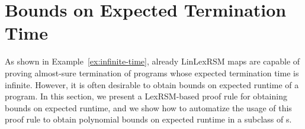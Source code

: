 \section{Bounds on Expected Termination Time}

As shown in Example~\ref{ex:infinite-time}, already LinLexRSM maps are capable of proving almost-sure termination of programs whose expected termination time is infinite. However, it is often desirable to obtain bounds on expected runtime of a program. In this section, we present a LexRSM-based proof rule for obtaining bounds on expected runtime, and we show how to automatize the usage of this proof rule to obtain polynomial bounds on expected runtime in a subclass of \PP{}s.

\begin{theorem}
\label{thm:runtime-bound}
\end{theorem}